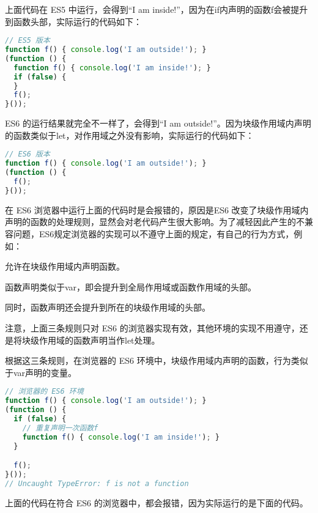 上面代码在 ES5 中运行，会得到“I am inside!”，因为在if内声明的函数f会被提升到函数头部，实际运行的代码如下：


\begin{lstlisting}[language=JavaScript]
// ES5 版本
function f() { console.log('I am outside!'); }
(function () {
  function f() { console.log('I am inside!'); }
  if (false) {
  }
  f();
}());
\end{lstlisting}



ES6 的运行结果就完全不一样了，会得到“I am outside!”。因为块级作用域内声明的函数类似于let，对作用域之外没有影响，实际运行的代码如下：



\begin{lstlisting}[language=JavaScript]
// ES6 版本
function f() { console.log('I am outside!'); }
(function () {
  f();
}());
\end{lstlisting}

在 ES6 浏览器中运行上面的代码时是会报错的，原因是ES6 改变了块级作用域内声明的函数的处理规则，显然会对老代码产生很大影响。为了减轻因此产生的不兼容问题，ES6规定浏览器的实现可以不遵守上面的规定，有自己的行为方式，例如：

\begin{compactitem}
\item 允许在块级作用域内声明函数。
\item 函数声明类似于var，即会提升到全局作用域或函数作用域的头部。
\item 同时，函数声明还会提升到所在的块级作用域的头部。
\end{compactitem}

注意，上面三条规则只对 ES6 的浏览器实现有效，其他环境的实现不用遵守，还是将块级作用域的函数声明当作let处理。


根据这三条规则，在浏览器的 ES6 环境中，块级作用域内声明的函数，行为类似于var声明的变量。




\begin{lstlisting}[language=JavaScript]
// 浏览器的 ES6 环境
function f() { console.log('I am outside!'); }
(function () {
  if (false) {
    // 重复声明一次函数f
    function f() { console.log('I am inside!'); }
  }

  f();
}());
// Uncaught TypeError: f is not a function
\end{lstlisting}

上面的代码在符合 ES6 的浏览器中，都会报错，因为实际运行的是下面的代码。




